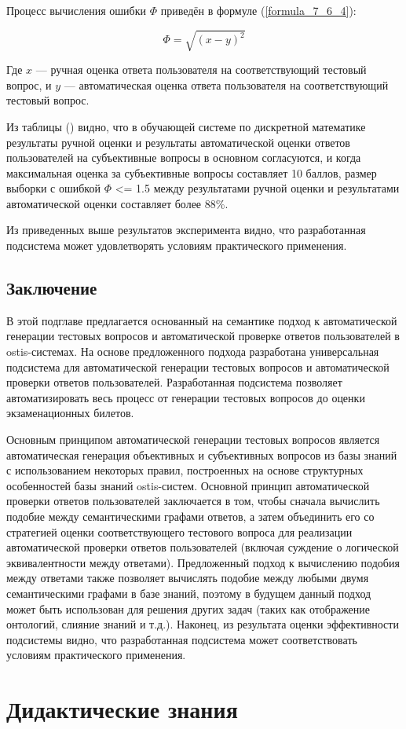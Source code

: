 Процесс вычисления ошибки $\Phi $ приведён в формуле (\ref{formula_7_6_4}):

\begin{equation}    
	\Phi =\sqrt{\left ( x -y \right ) ^{2} }   
	\label{formula_7_6_4} 
\end{equation}

Где $x$ --- ручная оценка ответа пользователя на соответствующий тестовый вопрос, и $y$ --- автоматическая оценка ответа пользователя на соответствующий тестовый вопрос.

Из таблицы (\textit{}) видно, что в обучающей системе по дискретной математике результаты ручной оценки и результаты автоматической оценки ответов пользователей на субъективные вопросы в основном согласуются, и когда максимальная оценка за субъективные вопросы составляет 10 баллов, размер выборки с ошибкой $\Phi$ <= 1.5 между результатами ручной оценки и результатами автоматической оценки составляет более 88\%.

Из приведенных выше результатов эксперимента видно, что разработанная подсистема может удовлетворять условиям практического применения.

\subsection{Заключение}

В этой подглаве предлагается основанный на семантике подход к автоматической генерации тестовых вопросов и автоматической проверке ответов пользователей в ostis-системах. На основе предложенного подхода разработана универсальная подсистема для автоматической генерации тестовых вопросов и автоматической проверки ответов пользователей. Разработанная подсистема позволяет автоматизировать весь процесс от генерации тестовых вопросов до оценки экзаменационных билетов.

Основным принципом автоматической генерации тестовых вопросов является автоматическая генерация объективных и субъективных вопросов из базы знаний с использованием некоторых правил, построенных на основе структурных особенностей базы знаний ostis-систем. Основной принцип автоматической проверки ответов пользователей заключается в том, чтобы сначала вычислить подобие между семантическими графами ответов, а затем объединить его со стратегией оценки соответствующего тестового вопроса для реализации автоматической проверки ответов пользователей (включая суждение о логической эквивалентности между ответами). Предложенный подход к вычислению подобия между ответами также позволяет вычислять подобие между любыми двумя семантическими графами в базе знаний, поэтому в будущем данный подход может быть использован для решения других задач (таких как отображение онтологий, слияние знаний и т.д.). Наконец, из результата оценки эффективности подсистемы видно, что разработанная подсистема может соответствовать условиям практического применения.


\section{Дидактические знания}
\label{section_knowledge_control}

%